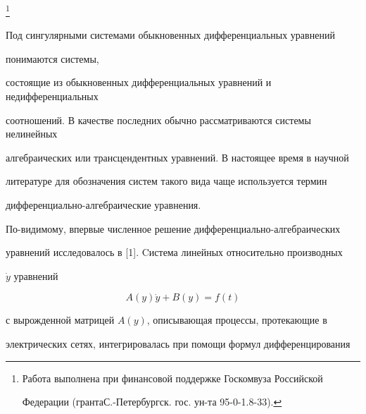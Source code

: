 \thanks{Работа выполнена при финансовой поддержке Госкомвуза Российской


Федерации (гранта\linebreak С.-Петербургск. гос. ун-та 95-0-1.8-33).}


\date{}







\pagestyle{plain} %













\maketitle


\label{begin}





Под сингулярными системами обыкновенных дифференциальных уравнений


понимаются системы,


состоящие из обыкновенных дифференциальных уравнений и недифференциальных


соотношений. В качестве последних обычно рассматриваются системы нелинейных


алгебраических или трансцендентных уравнений. В настоящее время в научной


литературе для обозначения систем такого вида чаще используется термин


дифференциально-алгебраические уравнения.





По-видимому, впервые численное решение дифференциально-алгебраических


уравнений исследовалось в [1]. Cистема линейных относительно производных


$\Dot y$ уравнений


$$


A(y)\Dot y+B(y)=f(t)


$$


с вырожденной матрицей $A(y)$, описывающая процессы, протекающие в


электрических сетях, интегрировалась при помощи формул дифференцирования


